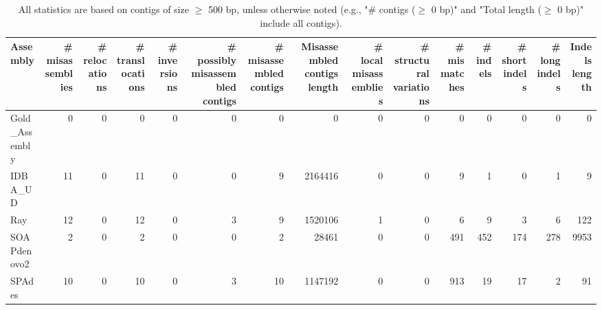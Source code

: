 \documentclass[12pt,a4paper]{article}
\begin{document}
\begin{table}[ht]
\begin{center}
\caption{All statistics are based on contigs of size $\geq$ 500 bp, unless otherwise noted (e.g., "\# contigs ($\geq$ 0 bp)" and "Total length ($\geq$ 0 bp)" include all contigs).}
\begin{tabular}{|l*{14}{|r}|}
\hline
Assembly & \# misassemblies &     \# relocations &     \# translocations &     \# inversions & \# possibly misassembled contigs & \# misassembled contigs & Misassembled contigs length & \# local misassemblies & \# structural variations & \# mismatches & \# indels &     \# short indels &     \# long indels & Indels length \\ \hline
Gold\_Assembly & 0 & 0 & 0 & 0 & 0 & 0 & 0 & 0 & 0 & 0 & 0 & 0 & 0 & 0 \\ \hline
IDBA\_UD & 11 & 0 & 11 & 0 & 0 & 9 & 2164416 & 0 & 0 & 9 & 1 & 0 & 1 & 9 \\ \hline
Ray & 12 & 0 & 12 & 0 & 3 & 9 & 1520106 & 1 & 0 & 6 & 9 & 3 & 6 & 122 \\ \hline
SOAPdenovo2 & 2 & 0 & 2 & 0 & 0 & 2 & 28461 & 0 & 0 & 491 & 452 & 174 & 278 & 9953 \\ \hline
SPAdes & 10 & 0 & 10 & 0 & 3 & 10 & 1147192 & 0 & 0 & 913 & 19 & 17 & 2 & 91 \\ \hline
\end{tabular}
\end{center}
\end{table}
\end{document}
